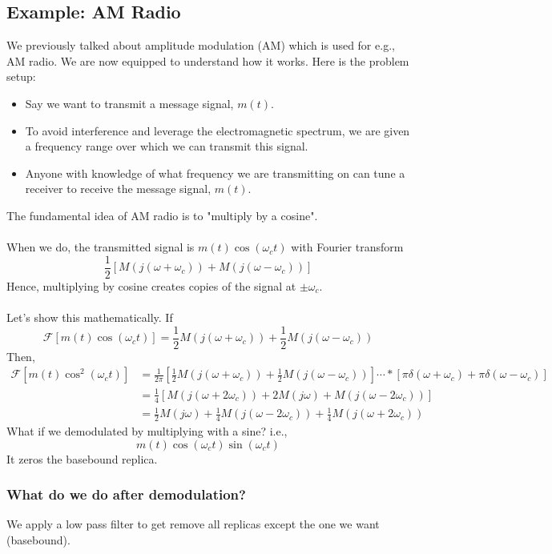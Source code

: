 \documentclass[10pt]{article}
\newcommand{\fourier}{\mathcal{F}}
\begin{document}
\subsection*{Example: AM Radio}
We previously talked about amplitude modulation (AM) which is used for e.g., AM radio.  We are now equipped to understand how it works.  Here is the problem setup:
\begin{itemize}
    \item Say we want to transmit a message signal, $m(t)$.
    \item To avoid interference and leverage the electromagnetic spectrum, we are given a frequency range over which we can transmit this signal.
    \item Anyone with knowledge of what frequency we are transmitting on can tune a receiver to receive the message signal, $m(t)$.
\end{itemize}
The fundamental idea of AM radio is to "multiply by a cosine".\\\\
When we do, the transmitted signal is $m(t) \cos(\omega_c t)$ with Fourier transform
\[\frac{1}{2} [M(j(\omega + \omega_c)) + M(j(\omega - \omega_c))]\]
Hence, multiplying by cosine creates copies of the signal at $\pm \omega_c$.\\\\
Let's show this mathematically.  If
\[\fourier[m(t) \cos(\omega_c t)] = \frac{1}{2} M(j(\omega + \omega_c)) + \frac{1}{2}M(j(\omega - \omega_c))\]
Then,
\begin{align*}
    \fourier[m(t) \cos^2(\omega_c t)] &= \frac{1}{2\pi} \left[\frac{1}{2} M(j(\omega + \omega_c)) + \frac{1}{2}M(j(\omega - \omega_c))\right] \cdots * [\pi \delta(\omega + \omega_c) + \pi\delta(\omega - \omega_c)]\\
    &= \frac{1}{4} \left[M(j(\omega + 2\omega_c)) + 2M(j\omega) + M(j(\omega - 2\omega_c))\right]\\
    &= \frac{1}{2} M(j\omega) + \frac{1}{4}M(j(\omega - 2\omega_c)) + \frac{1}{4}M(j(\omega + 2\omega_c))
\end{align*}
What if we demodulated by multiplying with a sine?  i.e.,
\[m(t)\cos(\omega_c t) \sin(\omega_c t)\]
It zeros the basebound replica.

\subsubsection*{What do we do after demodulation?}
We apply a low pass filter to get remove all replicas except the one we want (basebound).
\end{document}
